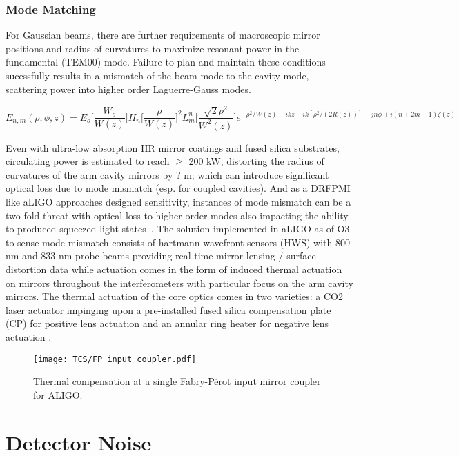 \subsubsection{Mode Matching}
For Gaussian beams, there are further requirements of macroscopic mirror positions and radius of curvatures to maximize resonant power in the fundamental (TEM00) mode. Failure to plan and maintain these conditions sucessfully results in a mismatch of the beam mode to the cavity mode, scattering power into higher order Laguerre-Gauss modes.  

\begin{equation}
	E_{n,m}(\rho, \phi, z) =  E_o \bigg[ \frac{W_o}{W(z)} \bigg] H_n \bigg[ \frac{\rho}{W(z)} \bigg]^2 L^n_m \bigg[ \frac{\sqrt{2}\rho^2}{W^2(z)} \bigg] e^{-\rho^2/W(z) - ikz - ik[\rho^2/(2R(z))] - jn \phi + i(n + 2m + 1)\zeta(z)}
\end{equation}

Even with ultra-low absorption HR mirror coatings and fused silica substrates, circulating power is estimated to reach $\geq$ 200 kW, distorting the radius of curvatures of the arm cavity mirrors by ? m; which can introduce significant optical loss due to mode mismatch (esp. for coupled cavities). And as a DRFPMI like aLIGO approaches designed sensitivity, instances of mode mismatch can be a two-fold threat with optical loss to higher order modes also impacting the ability to produced squeezed light states~\cite{}. The solution implemented in aLIGO as of O3 to sense mode mismatch consists of hartmann wavefront sensors (HWS) with 800 nm and 833 nm probe beams providing real-time mirror lensing / surface distortion data while actuation comes in the form of induced thermal actuation on mirrors throughout the interferometers with particular focus on the arm cavity mirrors. The thermal actuation of the core optics comes in two varieties: a CO2 laser actuator impinging upon a pre-installed fused silica compensation plate (CP) for positive lens actuation and an annular ring heater for negative lens actuation \cite{}. 

\begin{figure}[H]
	\texttt{[image: TCS/FP\_input\_coupler.pdf]}
\caption{Thermal compensation at a single Fabry-P\'{e}rot input mirror coupler for ALIGO.}
 \label{fig:meas}
\end{figure}

\section{Detector Noise}

